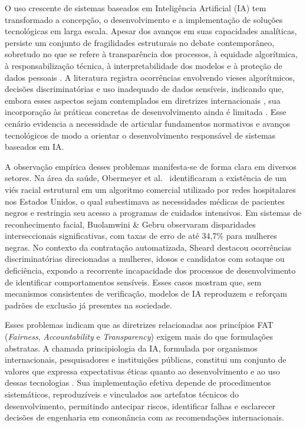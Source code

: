 \label{introducao}

O uso crescente de sistemas baseados em Inteligência Artificial (IA) tem transformado a concepção, o desenvolvimento e a implementação de soluções tecnológicas em larga escala. Apesar dos avanços em suas capacidades analíticas, persiste um conjunto de fragilidades estruturais no debate contemporâneo, sobretudo no que se refere à transparência dos processos, à equidade algorítmica, à responsabilização técnica, à interpretabilidade dos modelos e à proteção de dados pessoais \cite{Floridi2018, Ryan2020, Jobin2019, S042}. A literatura registra ocorrências envolvendo vieses algorítmicos, decisões discriminatórias e uso inadequado de dados sensíveis, indicando que, embora esses aspectos sejam contemplados em diretrizes internacionais \cite{UNESCO2021, EUAIAct2024}, sua incorporação às práticas concretas de desenvolvimento ainda é limitada \cite{Mittelstadt2019, Hagendorff2020}. Esse cenário evidencia a necessidade de articular fundamentos normativos e avanços tecnológicos de modo a orientar o desenvolvimento responsável de sistemas baseados em IA.

A observação empírica desses problemas manifesta-se de forma clara em diversos setores. Na área da saúde, Obermeyer et al.~\cite{Obermeyer2019} identificaram a existência de um viés racial estrutural em um algoritmo comercial utilizado por redes hospitalares nos Estados Unidos, o qual subestimava as necessidades médicas de pacientes negros e restringia seu acesso a programas de cuidados intensivos. Em sistemas de reconhecimento facial, Buolamwini \& Gebru \cite{Buolamwini2018} observaram disparidades interseccionais significativas, com taxas de erro de até 34,7\% para mulheres negras. No contexto da contratação automatizada, Sheard \cite{Sheard2025} destacou ocorrências discriminatórias direcionadas a mulheres, idosos e candidatos com sotaque ou deficiência, expondo a recorrente incapacidade dos processos de desenvolvimento de identificar comportamentos sensíveis. Esses casos mostram que, sem mecanismos consistentes de verificação, modelos de IA reproduzem e reforçam padrões de exclusão já presentes na sociedade.

Esses problemas indicam que as diretrizes relacionadas aos princípios FAT (\textit{Fairness}, \textit{Accountability} e \textit{Transparency}) exigem mais do que formulações abstratas. A chamada principiologia da IA, formulada por organismos internacionais, pesquisadores e instituições públicas, constitui um conjunto de valores que expressa expectativas éticas quanto ao desenvolvimento e ao uso dessas tecnologias \cite{Jobin2019, Hagendorff2020, Floridi2018}. Sua implementação efetiva depende de procedimentos sistemáticos, reproduzíveis e vinculados aos artefatos técnicos do desenvolvimento, permitindo antecipar riscos, identificar falhas e esclarecer decisões de engenharia em consonância com as recomendações internacionais.

